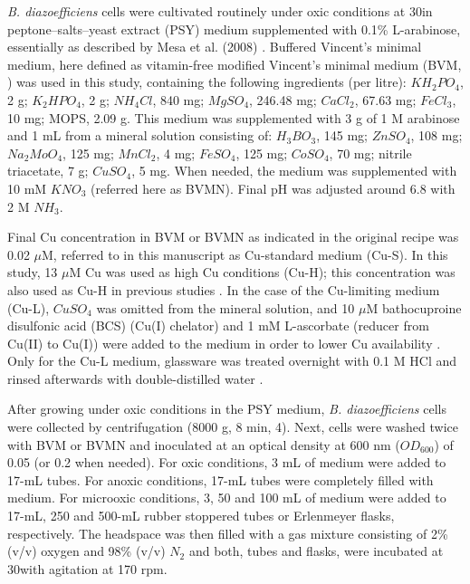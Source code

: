 \documentclass[a4paper,11pt]{article}
\begin{document}
{\em B. diazoefficiens}
cells were cultivated routinely under oxic conditions at 30\textcelsius in peptone–salts–yeast extract
(PSY) medium supplemented with 0.1\% L-arabinose, essentially as described by Mesa et al.
(2008) \cite{mesa2008comprehensive}. Buffered Vincent’s minimal medium, here defined as vitamin-free modified
Vincent’s minimal medium (BVM, \cite{vincent1970manual}\cite{becker2004global}) was used in this study, containing the following
ingredients (per litre): $KH_2PO_4$, 2 g; $K_2HPO_4$, 2 g; $NH_4Cl$, 840 mg; $MgSO_4$, 246.48 mg;
$CaCl_2$, 67.63 mg; $FeCl_3$, 10 mg; MOPS, 2.09 g. This medium was supplemented
with 3 g of 1 M arabinose and 1 mL from a mineral solution \cite{bishop1976relation} consisting of: $H_3BO_3$,
145 mg; $ZnSO_4$, 108 mg; $Na_2MoO_4$, 125 mg; $MnCl_2$, 4 mg; $FeSO_4$,
125 mg; $CoSO_4$, 70 mg; nitrile triacetate, 7 g; $CuSO_4$, 5 mg. When needed, the
medium was supplemented with 10 mM $KNO_3$ (referred here as BVMN). Final pH was
adjusted around 6.8 with 2 M $NH_3$.

Final Cu concentration in BVM or BVMN as indicated in the original recipe \cite{vincent1970manual} was
0.02 $\mu$M, referred to in this manuscript as Cu-standard medium (Cu-S). In this study, 13 $\mu$M
Cu was used as high Cu conditions (Cu-H); this concentration was also used as Cu-H in
previous studies \cite{felgate2012impact}\cite{sullivan2013copper}. In the case of the Cu-limiting medium (Cu-L), $CuSO_4$ was
omitted from the mineral solution, and 10 $\mu$M bathocuproine disulfonic acid (BCS) (Cu(I)
chelator) and 1 mM L-ascorbate (reducer from Cu(II) to Cu(I)) were added to the medium
in order to lower Cu availability \cite{felgate2012impact}\cite{serventi2012copper}. Only for the Cu-L medium, glassware was treated
overnight with 0.1 M HCl and rinsed afterwards with double-distilled water \cite{serventi2012copper}.

After growing under oxic conditions in the PSY medium, {\em B. diazoefficiens} cells were
collected by centrifugation (8000 g, 8 min, 4\textcelsius). Next, cells were washed twice with BVM
or BVMN and inoculated at an optical density at 600 nm ($OD_{600}$) of 0.05 (or 0.2 when needed). For oxic conditions,
3 mL of medium were added to 17-mL tubes. For anoxic conditions, 17-mL tubes were
completely filled with medium. For microoxic conditions, 3, 50 and 100 mL of medium were added to 17-mL, 250 and 500-mL rubber stoppered tubes or Erlenmeyer flasks, respectively.
The headspace was then filled with a gas mixture consisting of 2\% (v/v) oxygen and 98\% (v/v)
$N_2$ and both, tubes and flasks, were incubated at 30\textcelsius with agitation at 170 rpm.
\end{document}
